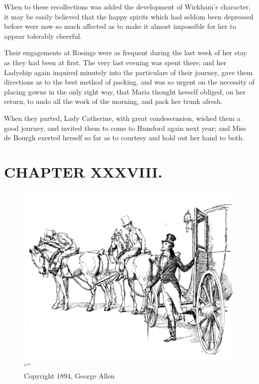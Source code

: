 When to these recollections was added the development of Wickham's character, it may be easily believed that the happy spirits which had seldom been depressed before were now so much affected as to make it almost impossible for her to appear tolerably cheerful.

Their engagements at Rosings were as frequent during the last week of her stay as they had been at first. The very last evening was spent there; and her Ladyship again inquired minutely into the particulars of their journey, gave them directions as to the best method of packing, and was so urgent on the necessity of placing gowns in the only right way, that Maria thought herself obliged, on her return, to undo all the work of the morning, and pack her trunk afresh.

When they parted, Lady Catherine, with great condescension, wished them a good journey, and invited them to come to Hunsford again next year; and Miss de Bourgh exerted herself so far as to courtesy and hold out her hand to both.



\chapter{CHAPTER XXXVIII.}

\begin{figure}[htbp]
    \centering
    \includegraphics[width=\textwidth]{illustrations/i_031.jpg}
    \caption{“”\\ Copyright 1894, George Allen}
    \label{fig:image}
\end{figure}



